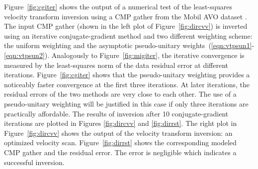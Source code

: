 Figure~\ref{fig:cgiter} shows the output of a numerical test of the
least-squares velocity transform inversion using a CMP gather from the
Mobil AVO dataset \cite[]{SEG-1995-1460}. The input CMP gather (shown in
the left plot of Figure~\ref{fig:dircvv}) is inverted using an
iterative conjugate-gradient method and two different weighting
scheme: the uniform weighting and the asymptotic pseudo-unitary
weights~(\ref{eqn:vtpsun1}-\ref{eqn:vtpsun2}). Analogously to
Figure~\ref{fig:migiter}, the iterative convergence is measured by the
least-squares norm of the data residual error at different iterations.
Figure~\ref{fig:cgiter} shows that the pseudo-unitary weighting
provides a noticeably faster convergence at the first three
iterations. At later iterations, the residual errors of the two
methods are very close to each other. The use of a pseudo-unitary
weighting will be justified in this case if only three iterations are
practically affordable.  The results of inversion after 10
conjugate-gradient iterations are plotted in Figures \ref{fig:dircvv}
and \ref{fig:dirrst}. The right plot in Figure~\ref{fig:dircvv} shows
the output of the velocity transform inversion: an optimized velocity
scan. Figure~\ref{fig:dirrst} shows the corresponding modeled CMP
gather and the residual error. The error is negligible which
indicates a successful inversion.





